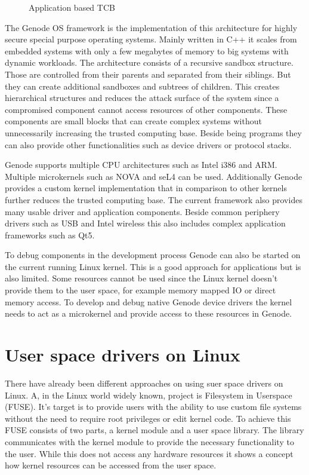 \documentclass[
a4paper,
12pt,
notitlepage,
parskip=half,
DIV=11,
]{scrbook}
\begin{document}
		\begin{figure}
			\centering
			
			\caption{Application based TCB \citep{genode}}
			\label{fig:tcb_tree}
		\end{figure}
	
		The Genode OS framework is the implementation of this architecture for highly secure special purpose operating systems.
		Mainly written in C++ it scales from embedded systems with only a few megabytes of memory to big systems with dynamic workloads.
		The architecture consists of a recursive sandbox structure.
		Those are controlled from their parents and separated from their siblings.
		But they can create additional sandboxes and subtrees of children.
		This creates hierarchical structures and reduces the attack surface of the system since a compromised component cannot access resources of other components.
		These components are small blocks that can create complex systems without unnecessarily increasing the trusted computing base.
		Beside being programs they can also provide other functionalities such as device drivers or protocol stacks.
		
		Genode supports multiple CPU architectures such as Intel i386 and ARM.
		Multiple microkernels such as NOVA and seL4 can be used.
		Additionally Genode provides a custom kernel implementation that in comparison to other kernels further reduces the trusted computing base.
		The current framework also provides many usable driver and application components.
		Beside common periphery drivers such as USB and Intel wireless this also includes complex application frameworks such as Qt5. \citep{genode}
		
		To debug components in the development process Genode can also be started on the current running Linux kernel.
		This is a good approach for applications but is also limited.
		Some resources cannot be used since the Linux kernel doesn't provide them to the user space, for example memory mapped IO or direct memory access.
		To develop and debug native Genode device drivers the kernel needs to act as a microkernel and provide access to these resources in Genode.
		
		\section{User space drivers on Linux}
		
		There have already been different approaches on using suer space drivers on Linux.
		A, in the Linux world widely known, project is Filesystem in Userspace (FUSE).
		It's target is to provide users with the ability to use custom file systems without the need to require root privileges or edit kernel code.
		To achieve this FUSE consists of two parts, a kernel module and a user space library.
		The library communicates with the kernel module to provide the necessary functionality to the user.
		While this does not access any hardware resources it shows a concept how kernel resources can be accessed from the user space. \citep{fuse}
		
\end{document}

